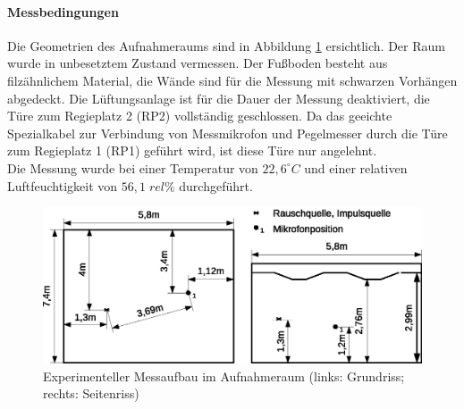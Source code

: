 \documentclass[11pt]{report}
\begin{document}
\paragraph{Messbedingungen}
Die Geometrien des Aufnahmeraums sind in Abbildung \ref{fig:ARgeometrics} ersichtlich. Der Raum wurde in unbesetztem Zustand vermessen. Der Fu\ss boden besteht aus filz\"ahnlichem Material, die W\"ande sind f\"ur die Messung mit schwarzen Vorh\"angen abgedeckt. Die L\"uftungsanlage ist f\"ur die Dauer der Messung deaktiviert, die T\"ure zum Regieplatz 2 (RP2) vollst\"andig geschlossen. Da das geeichte Spezialkabel zur Verbindung von Messmikrofon und Pegelmesser durch die T\"ure zum Regieplatz 1 (RP1) gef\"uhrt wird, ist diese T\"ure nur angelehnt.\\
Die Messung wurde bei einer Temperatur von $22,6^\circ C $ und einer relativen Luftfeuchtigkeit von $56,1\;rel\%$ durchgef\"uhrt.
\begin{figure}[htbp]
\begin{center}
\includegraphics[width=14cm,keepaspectratio=true]{AR}
\caption{Experimenteller Messaufbau im Aufnahmeraum (links: Grundriss; rechts: Seitenriss)}
\label{fig:ARgeometrics}
\end{center}
\end{figure}
\end{document}
